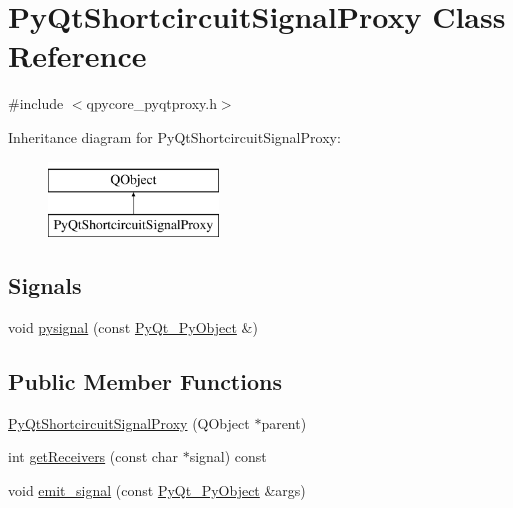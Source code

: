 \hypertarget{classPyQtShortcircuitSignalProxy}{}\section{Py\+Qt\+Shortcircuit\+Signal\+Proxy Class Reference}
\label{classPyQtShortcircuitSignalProxy}


{\ttfamily \#include $<$qpycore\+\_\+pyqtproxy.\+h$>$}

Inheritance diagram for Py\+Qt\+Shortcircuit\+Signal\+Proxy\+:\begin{figure}[H]
\begin{center}
\leavevmode
\includegraphics[height=2.000000cm]{classPyQtShortcircuitSignalProxy}
\end{center}
\end{figure}
\subsection*{Signals}
\begin{DoxyCompactItemize}
\item 
void \hyperlink{classPyQtShortcircuitSignalProxy_ae4d2123de56230f90f0de64c4ae950ee}{pysignal} (const \hyperlink{classPyQt__PyObject}{Py\+Qt\+\_\+\+Py\+Object} \&)
\end{DoxyCompactItemize}
\subsection*{Public Member Functions}
\begin{DoxyCompactItemize}
\item 
\hyperlink{classPyQtShortcircuitSignalProxy_aa716fb6142c7f6e6a79201b741963307}{Py\+Qt\+Shortcircuit\+Signal\+Proxy} (Q\+Object $\ast$parent)
\item 
int \hyperlink{classPyQtShortcircuitSignalProxy_a04a4b6ec4f3932d1c0ef7a97c9acec57}{get\+Receivers} (const char $\ast$signal) const 
\item 
void \hyperlink{classPyQtShortcircuitSignalProxy_af1250bc07b323042a5789b86ad7c2ed8}{emit\+\_\+signal} (const \hyperlink{classPyQt__PyObject}{Py\+Qt\+\_\+\+Py\+Object} \&args)
\end{DoxyCompactItemize}
